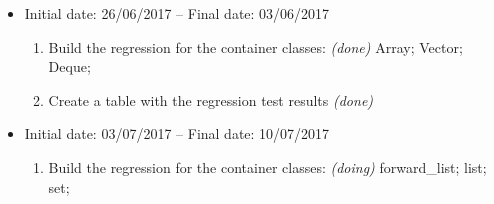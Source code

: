 \documentclass[11pt]{article}
\begin{document}
\begin{itemize}
	\item Initial date: 26/06/2017 -- Final date: 03/06/2017
	\begin{enumerate}
		\item Build the regression for the container classes: {\it (done)}
		    \subitem Array;
		    \subitem Vector;
		    \subitem Deque;
		\item Create a table with the regression test results {\it (done)}
	\end{enumerate}
	
	\item Initial date: 03/07/2017 -- Final date: 10/07/2017
	\begin{enumerate}
		\item Build the regression for the container classes: {\it (doing)}
		    \subitem forward_list;
		    \subitem list;
		    \subitem set;		
	\end{enumerate}
	
	
\end{itemize}
\end{document}
